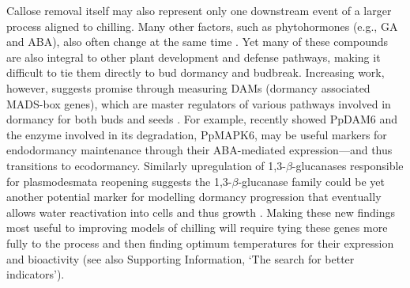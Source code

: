 \documentclass[11pt]{article}
\newcommand{\R}[1]{\label{#1}\linelabel{#1}}
\begin{document}
\R{r2momolS}Callose removal itself may also represent only one downstream event of a larger process aligned to chilling. Many other factors, such as phytohormones (e.g., GA and ABA), also often change at the same time \citep[Figure \ref{fig:modelsketch},][]{tuan2017dormancy,rinne2018,tylewicz2018photoperiodic,pan2023epigenetic,andre2022populus}. Yet many of these compounds are also integral to other plant development and defense pathways, making it difficult to tie them directly to bud dormancy and budbreak. Increasing work, however, suggests promise through measuring DAMs (dormancy associated MADS-box genes), which are master regulators of various pathways involved in dormancy for both buds and seeds \citep{leida2012chilling,tuan2017dormancy}. 
For example, \citet{zhang2023ppmapk6} recently showed  PpDAM6 and the enzyme involved in its degradation, PpMAPK6, may be useful markers for endodormancy maintenance through their ABA-mediated expression---and thus transitions to ecodormancy. Similarly upregulation of 1,3-$\beta$-glucanases responsible for plasmodesmata reopening \citep{rinne2011,singh2018genetic} suggests the 1,3-$\beta$-glucanase family could be yet another potential marker for modelling dormancy progression that eventually allows water reactivation into cells and thus growth \citep{faust1991bound,Kalcsits2009,walde2024stable}. Making these new findings most useful to improving models of chilling will require tying these genes more fully to the process and then finding optimum temperatures for their expression and bioactivity (see also Supporting Information, `The search for better indicators'). \R{r2momolE}


\end{document}
